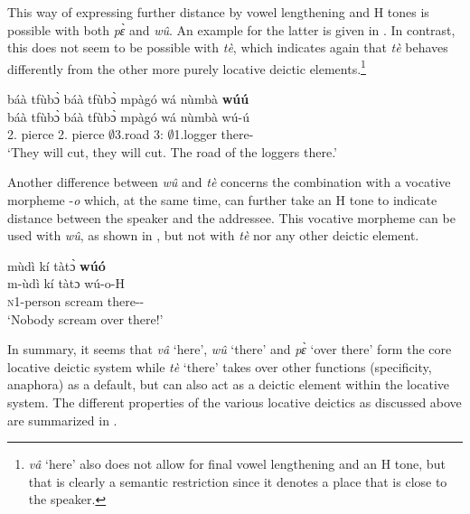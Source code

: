 \noindent This way of expressing further distance by vowel lengthening and H tones is possible with both {\itshape pɛ̀} and {\itshape wû}. An example for the latter is given in . In contrast, this does not seem to be possible with {\itshape tè}, which indicates again that {\itshape tè} behaves differently from the other more purely locative deictic elements.\footnote{{\itshape vâ} `here' also does not allow for final vowel lengthening and an H tone, but that is clearly a semantic restriction since it denotes a place that is close to the speaker.}

\ea \label{wUU}
  \glll  báà tfùbɔ̀ báà tfùbɔ̀ mpàgó wá nùmbà {\bfseries wúú}\\
         báà tfùbɔ̀ báà tfùbɔ̀ mpàgó wá nùmbà wú-ú\\
          2.{\FUT} pierce 2.{\FUT} pierce $\emptyset$3.road 3:{\ATT} $\emptyset$1.logger there-{\DIST} \\
    \trans `They will cut, they will cut. The road of the loggers there.'
\z

Another difference between {\itshape wû} and {\itshape tè} concerns the combination with a vocative morpheme -{\itshape o} which, at the same time, can further take an H tone to indicate distance between the speaker and the addressee. This vocative morpheme can be used with {\itshape wû}, as shown in , but not with {\itshape tè} nor any other deictic element.

\ea \label{wuo}
  \glll mùdì kí tàtɔ̀ {\bfseries wúó} \\
        m-ùdì kí tàtɔ wú-o-H \\
        \textsc{n}1-person {\NEG} scream there-{\VOC}-{\DIST} \\
    \trans `Nobody scream over there!'
\z

In summary, it seems that {\itshape vâ} `here', {\itshape wû} `there' and {\itshape pɛ̀} `over there' form the core locative deictic system while {\itshape tè} `there' takes over other functions (specificity, anaphora) as a default, but can also act as a deictic element within the locative system. The different properties of the various locative deictics as discussed above are summarized in .



